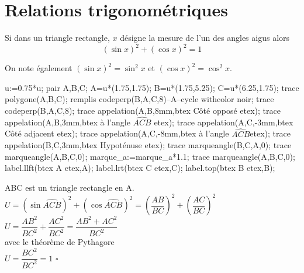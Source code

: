 \section{Relations trigonométriques}
\begin{propriete}
    Si dans un triangle rectangle, $x$ désigne la mesure de l'un des angles aigus alors 
    $$(\sin x)^2+(\cos x)^2=1$$
\end{propriete}

\begin{remarque}
    On note également $(\sin x)^2=\sin^2x$ et $(\cos x)^2=\cos^2x$.
\end{remarque}

\begin{preuve}

    \begin{minipage}{0.4\linewidth}
        \begin{Geometrie}[CoinHD={(5u,4.5u)}]
            u:=0.75*u;            
            pair A,B,C;
            A=u*(1.75,1.75);
            B=u*(1.75,5.25);
            C=u*(6.25,1.75);
            trace polygone(A,B,C);
            remplis codeperp(B,A,C,8)--A--cycle withcolor noir;
            trace codeperp(B,A,C,8);
            trace appelation(A,B,8mm,btex Côté opposé etex);
            trace appelation(A,B,3mm,btex à l'angle $\widehat{ACB}$ etex);
            trace appelation(A,C,-3mm,btex Côté adjacent etex);
            trace appelation(A,C,-8mm,btex à l'angle $\widehat{ACB}$etex);
            trace appelation(B,C,3mm,btex Hypoténuse etex);            
            trace marqueangle(B,C,A,0);
            trace marqueangle(A,B,C,0);
            marque_a:=marque_a*1.1;    
            trace marqueangle(A,B,C,0);
            label.llft(btex A etex,A);
            label.lrt(btex C etex,C);
            label.top(btex B etex,B);
        \end{Geometrie}
    \end{minipage}
    \begin{minipage}{0.55\linewidth}
        ABC est un triangle rectangle en A.\\\bigskip
        $U=(\sin \widehat{ACB})^2+(\cos \widehat{ACB})^2=(\dfrac{AB}{BC})^2+(\dfrac{AC}{BC})^2$\\\bigskip
        $U=\dfrac{AB^2}{BC^2}+\dfrac{AC^2}{BC^2}=\dfrac{AB^2+AC^2}{BC^2}$\\\bigskip
        avec le théorème de Pythagore\\\bigskip
        $U=\dfrac{BC^2}{BC^2}=1$ $\square$
    \end{minipage}
\end{preuve}

